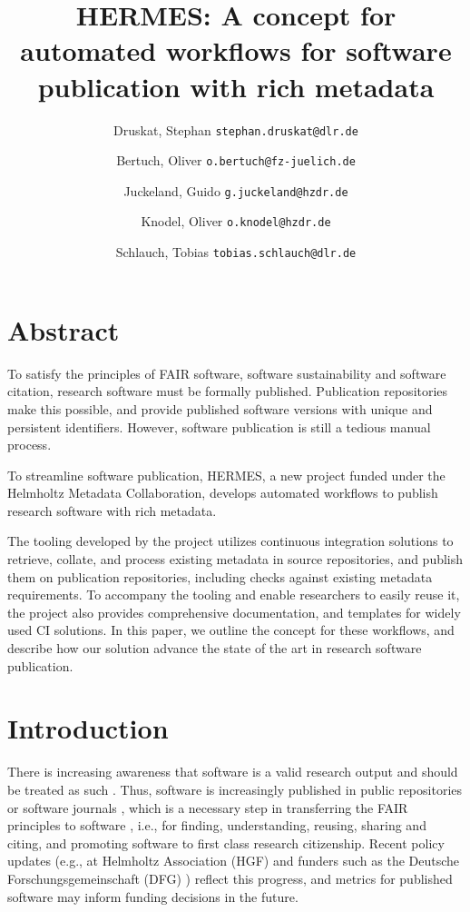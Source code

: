 \documentclass{article}
\title{HERMES: A concept for automated workflows for software publication with rich metadata}
\author{
Druskat, Stephan \texttt{stephan.druskat@dlr.de}\and
Bertuch, Oliver \texttt{o.bertuch@fz-juelich.de}\and
Juckeland, Guido \texttt{g.juckeland@hzdr.de}\and
Knodel, Oliver \texttt{o.knodel@hzdr.de}\and
Schlauch, Tobias \texttt{tobias.schlauch@dlr.de}
}
\begin{document}
\maketitle


\section{Abstract}\label{sec:abstract}
To satisfy the principles of FAIR software, software sustainability and software citation, research software must be formally published. Publication repositories make this possible, and provide published software versions with unique and persistent identifiers. However, software publication is still a tedious manual process.

To streamline software publication, HERMES, a new project funded under the Helmholtz Metadata Collaboration, develops automated workflows to publish research software with rich metadata.

The tooling developed by the project utilizes continuous integration solutions to retrieve, collate, and process existing metadata in source repositories, and publish them on publication repositories, including checks against existing metadata requirements. To accompany the tooling and enable researchers to easily reuse it, the project also provides comprehensive documentation, and templates for widely used CI solutions. In this paper, we outline the concept for these workflows, and describe how our solution advance the state of the art in research software publication.



\section{Introduction}\label{sec:introduction}
There is increasing awareness that software is a valid research output and should be treated as such \cite{11045035/YUM73BP7}. Thus, software is increasingly published in public repositories or software journals \cite{138880/CVGZJALP}, which is a necessary step in transferring the FAIR principles to software \cite{11045035/FNK2BYH3}, i.e., for finding, understanding, reusing, sharing and citing, and promoting software to first class research citizenship. Recent policy updates (e.g., at Helmholtz Association (HGF) \cite{11045035/N56QGRXT} and funders such as the Deutsche Forschungsgemeinschaft (DFG) \cite{11045035/YMQTEV42}) reflect this progress, and metrics for published software may inform funding decisions in the future.
\end{document}
